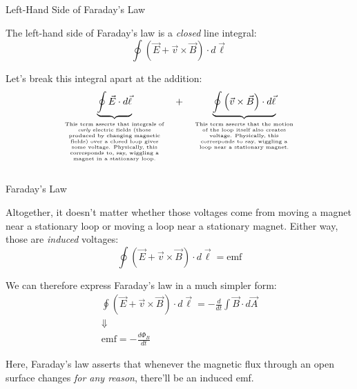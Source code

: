 \documentclass{beamer}
\begin{document}
\begin{frame}{Left-Hand Side of Faraday's Law}

The left-hand side of Faraday's law is a \emph{closed} line integral:
\begin{equation*}
    \oint \left( \vec{E} + \vec{v} \times \vec{B} \right) \cdot d\vec{\ell}
\end{equation*}

Let's break this integral apart at the addition:
\begin{equation*}
    \underbrace{\oint \vec{E} \cdot d\vec{\ell}}_{\parbox[c]{0.3\textwidth}{\vspace{-0.8em} \begin{center} \tiny This term asserts that integrals of \emph{curly} electric fields (those produced by changing magnetic fields) over a closed loop gives some voltage. Physically, this corresponds to, say, wiggling a magnet in a stationary loop. \end{center}}} \quad + \quad \underbrace{\oint \left( \vec{v} \times \vec{B} \right) \cdot d\vec{\ell}}_{\parbox[c]{0.3\textwidth}{\vspace{-0.8em}\begin{center} \tiny This term asserts that the motion of the loop itself also creates voltage. Physically, this corresponds to say, wiggling a loop near a stationary magnet. \end{center}}}
\end{equation*}

\end{frame}

\begin{frame}{Faraday's Law}

Altogether, it doesn't matter whether those voltages come from moving a magnet near a stationary loop or moving a loop near a stationary magnet. Either way, those are \emph{induced} voltages:
\begin{equation*}
    \oint \left( \vec{E} + \vec{v} \times \vec{B} \right) \cdot d\vec{\ell} = \text{emf}
\end{equation*}

We can therefore express Faraday's law in a much simpler form:
\begin{gather*}
    \oint \left( \vec{E} + \vec{v} \times \vec{B} \right) \cdot d\vec{\ell} = -\frac{d}{dt} \int \vec{B} \cdot d\vec{A} \\
    \Downarrow \\
    \text{emf} = -\frac{d\Phi_B}{dt}
\end{gather*}

Here, Faraday's law asserts that whenever the magnetic flux through an open surface changes \emph{for any reason}, there'll be an induced emf.

\end{frame}
\end{document}
